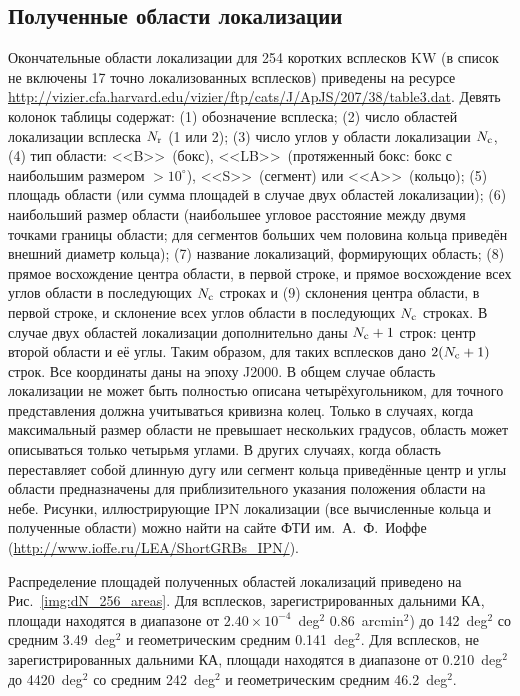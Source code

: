 \subsection{Полученные области локализации}
Окончательные области локализации для 254 коротких всплесков KW 
(в список не включены 17 точно локализованных всплесков) приведены на ресурсе 
\url{http://vizier.cfa.harvard.edu/vizier/ftp/cats/J/ApJS/207/38/table3.dat}.
Девять колонок таблицы содержат: 
(1) обозначение всплеска; (2) число областей локализации всплеска $N_{{\mathrm{r}}}$ (1 или 2); 
(3) число углов у области локализации $N_{{\mathrm{c}}}$, 
(4) тип области: <<B>>\ (бокс), <<LB>>\ (протяженный бокс: бокс с наибольшим размером $> 10^\circ$),
<<S>>\ (сегмент) или <<A>>\ (кольцо);
(5) площадь области (или сумма площадей в случае двух областей локализации); 
(6) наибольший размер области (наибольшее угловое расстояние между двумя точками границы области; 
для сегментов больших чем половина кольца приведён внешний диаметр кольца);
(7) название локализаций, формирующих область;
(8) прямое восхождение центра области, в первой строке, и прямое восхождение 
всех углов области в последующих $N_{\mathrm{c}}$ строках и 
(9) склонения центра области, в первой строке, и склонение всех углов области в последующих
$N_{\mathrm{c}}$ строках. В случае двух областей локализации дополнительно даны $N_{{\mathrm{c}}} + 1$ строк: 
центр второй области и её углы. 
Таким образом, для таких всплесков дано $2(N_{{\mathrm{c}}} + 1)$ строк. Все координаты даны на эпоху J2000.
В общем случае область локализации не может быть полностью описана четырёхугольником, 
для точного представления должна учитываться кривизна колец. Только в случаях, 
когда максимальный размер области не превышает нескольких градусов, 
область может описываться только четырьмя углами. В других случаях, когда область переставляет
собой длинную дугу или сегмент кольца приведённые центр и углы области предназначены
для приблизительного указания положения области на небе. Рисунки, иллюстрирующие
IPN локализации (все вычисленные кольца и полученные области) можно найти на сайте
ФТИ им.~А.~Ф.~Иоффе (\url{http://www.ioffe.ru/LEA/ShortGRBs_IPN/}).

Распределение площадей полученных областей локализаций приведено на Рис.~\ref{img:dN_256_areas}.
Для всплесков, зарегистрированных дальними КА, площади находятся в диапазоне от 
$2.40 \times 10^{-4}$~deg$^2$ 0.86~arcmin$^2$) до 142~deg$^2$ со средним 3.49~deg$^2$ 
и геометрическим средним 0.141~deg$^2$. Для всплесков, не зарегистрированных дальними КА, 
площади находятся в диапазоне от 0.210~deg$^2$ до 4420~deg$^2$ со средним 242~deg$^2$
и геометрическим средним 46.2~deg$^2$.

